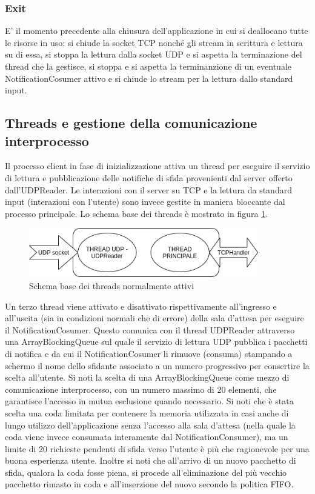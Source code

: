 \documentclass{article}
\begin{document}
    \subsubsection{Exit} E' il momento precedente alla chiusura dell'applicazione in cui si deallocano tutte le risorse in uso: si chiude la socket TCP nonché gli stream in scrittura e lettura su di essa, si stoppa la lettura dalla socket UDP e si aspetta la terminazione del thread che la gestisce, si stoppa e si aspetta la terminanzione di un eventuale NotificationCosumer attivo e si chiude lo stream per la lettura dallo standard input.

    \subsection{Threads e gestione della comunicazione interprocesso}\label{client_threads}
    Il processo client in fase di inizializzazione attiva un thread per eseguire il servizio di lettura e pubblicazione delle notifiche di sfida provenienti dal server offerto dall'UDPReader. Le interazioni con il server su TCP e la lettura da standard input (interazioni con l'utente) sono invece gestite in maniera bloccante dal processo principale.
    \newline
    Lo schema base dei threads è mostrato in figura \ref{fig:thread_client_1}.
    \begin{figure}[htp]
        \centering
        \includegraphics[width=10cm]{threads_client_1.png}
        \caption{Schema base dei threads normalmente attivi}
        \label{fig:thread_client_1}
    \end{figure}

    Un terzo thread viene attivato e disattivato rispettivamente all'ingresso e all'uscita (sia in condizioni normali che di errore) della sala d'attesa per eseguire il NotificationCosumer. Questo comunica con il thread UDPReader attraverso una ArrayBlockingQueue sul quale il servizio di lettura UDP pubblica i pacchetti di notifica e da cui il NotificationCosumer li rimuove (consuma) stampando a schermo il nome dello sfidante associato a un numero progressivo per consertire la scelta all'utente. Si noti la scelta di una ArrayBlockingQueue come mezzo di comunicazione interprocesso, con un numero massimo di 20 elementi, che garantisce l'accesso in mutua esclusione quando necessario. Si noti che è stata scelta una coda limitata per contenere la memoria utilizzata in casi anche di lungo utilizzo dell'applicazione senza l'accesso alla sala d'attesa (nella quale la coda viene invece consumata interamente dal NotificationConsumer), ma un limite di 20 richieste pendenti di sfida verso l'utente è più che ragionevole per una buona esperienza utente. Inoltre si noti che all'arrivo di un nuovo pacchetto di sfida, qualora la coda fosse piena, si procede all'eliminazione del più vecchio pacchetto rimasto in coda e all'inserzione del nuovo secondo la politica FIFO.
\end{document}
